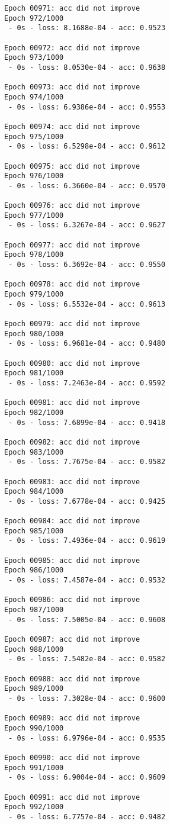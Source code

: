 \documentclass[11pt]{article}
\begin{document}
\begin{Verbatim}[commandchars=\\\{\}]
Epoch 00971: acc did not improve
Epoch 972/1000
 - 0s - loss: 8.1688e-04 - acc: 0.9523

Epoch 00972: acc did not improve
Epoch 973/1000
 - 0s - loss: 8.0530e-04 - acc: 0.9638

Epoch 00973: acc did not improve
Epoch 974/1000
 - 0s - loss: 6.9386e-04 - acc: 0.9553

Epoch 00974: acc did not improve
Epoch 975/1000
 - 0s - loss: 6.5298e-04 - acc: 0.9612

Epoch 00975: acc did not improve
Epoch 976/1000
 - 0s - loss: 6.3660e-04 - acc: 0.9570

Epoch 00976: acc did not improve
Epoch 977/1000
 - 0s - loss: 6.3267e-04 - acc: 0.9627

Epoch 00977: acc did not improve
Epoch 978/1000
 - 0s - loss: 6.3692e-04 - acc: 0.9550

Epoch 00978: acc did not improve
Epoch 979/1000
 - 0s - loss: 6.5532e-04 - acc: 0.9613

Epoch 00979: acc did not improve
Epoch 980/1000
 - 0s - loss: 6.9681e-04 - acc: 0.9480

Epoch 00980: acc did not improve
Epoch 981/1000
 - 0s - loss: 7.2463e-04 - acc: 0.9592

Epoch 00981: acc did not improve
Epoch 982/1000
 - 0s - loss: 7.6899e-04 - acc: 0.9418

Epoch 00982: acc did not improve
Epoch 983/1000
 - 0s - loss: 7.7675e-04 - acc: 0.9582

Epoch 00983: acc did not improve
Epoch 984/1000
 - 0s - loss: 7.6778e-04 - acc: 0.9425

Epoch 00984: acc did not improve
Epoch 985/1000
 - 0s - loss: 7.4936e-04 - acc: 0.9619

Epoch 00985: acc did not improve
Epoch 986/1000
 - 0s - loss: 7.4587e-04 - acc: 0.9532

Epoch 00986: acc did not improve
Epoch 987/1000
 - 0s - loss: 7.5005e-04 - acc: 0.9608

Epoch 00987: acc did not improve
Epoch 988/1000
 - 0s - loss: 7.5482e-04 - acc: 0.9582

Epoch 00988: acc did not improve
Epoch 989/1000
 - 0s - loss: 7.3028e-04 - acc: 0.9600

Epoch 00989: acc did not improve
Epoch 990/1000
 - 0s - loss: 6.9796e-04 - acc: 0.9535

Epoch 00990: acc did not improve
Epoch 991/1000
 - 0s - loss: 6.9004e-04 - acc: 0.9609

Epoch 00991: acc did not improve
Epoch 992/1000
 - 0s - loss: 6.7757e-04 - acc: 0.9482


\end{Verbatim}
\end{document}
